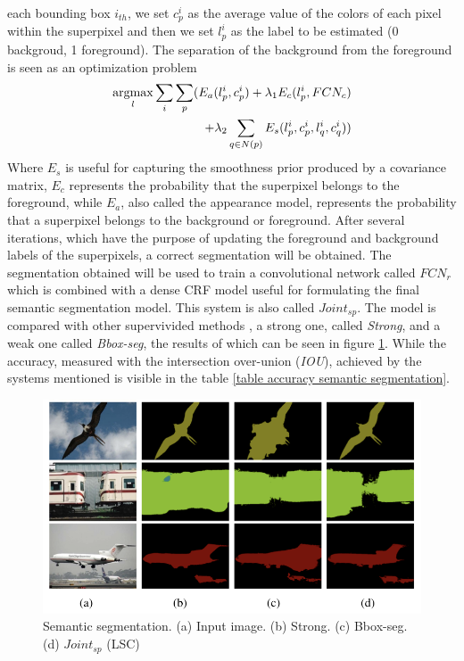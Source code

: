 each bounding box $ i_{th} $, we set $ c_p^i $ as the average value of the colors of each 
pixel within the superpixel and then we set $ l_p^i $ as the label to be estimated (0 
backgroud, 1 foreground). The separation of the background from the 
foreground is seen as an optimization problem
\begin{equation}
    \begin{split}
        \operatorname*{argmax}\limits_{l} \sum_i\sum_p(E_a(l_p^i,c_p^i) + \lambda_1E_c(l_p^i, FCN_c)\\
        + \lambda_2\sum_{q\in N(p)}E_s(l_p^i,c_p^i,l_q^i,c_q^i)) 
    \end{split}
\end{equation}
Where $ E_s $ is useful for capturing the smoothness prior produced by a covariance 
matrix, $ E_c $ represents the probability that the superpixel belongs 
to the foreground, while $ E_a $, also called the appearance model, represents 
the probability that a superpixel belongs to the background or foreground. 
After several iterations, which have the purpose of updating the foreground 
and background labels of the superpixels, a correct segmentation will be 
obtained. The segmentation obtained will be used to train a convolutional 
network called $ FCN_r $ which is combined with a dense CRF model useful for 
formulating the final semantic segmentation model. This system is also 
called $ Joint_{sp} $. The model is compared with other supervivided methods \cite{0781426541}, 
a strong one, called \emph{Strong}, and a weak one called \emph{Bbox-seg}, the results of 
which can be seen in figure \ref{fig: semanticSegmentation}. While the accuracy, measured with the intersection 
over-union (\emph{IOU}), achieved by the systems mentioned is visible in the 
table \ref{table accuracy semantic segmentation}.

\begin{figure}[htbp]
    \centering
    \includegraphics[width = 0.8 \linewidth]{images/paper2/segmentationAlgo.png}
    \centering
    \caption{Semantic segmentation. (a) Input image. (b) Strong. (c) Bbox-seg. (d) $ Joint_{sp} $ (LSC) }
    \label{fig: semanticSegmentation}
\end{figure}

